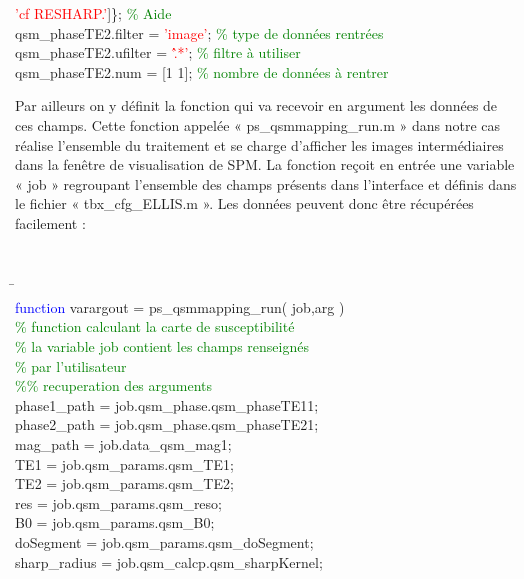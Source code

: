 {{\begin{tabbing}
\> \textcolor{red}{'cf RESHARP.'}]\}; \textcolor{green}{\% Aide}\\
\> qsm\_phaseTE2.filter = \textcolor{red}{'image'}; \textcolor{green}{\% type de données rentrées}\\
\> qsm\_phaseTE2.ufilter = \textcolor{red}{'\^.*'}; \textcolor{green}{\% filtre à utiliser}\\
\> qsm\_phaseTE2.num = [1 1]; \textcolor{green}{\% nombre de données à rentrer}\vspace{0.5cm}\\
\end{tabbing}
}
Par ailleurs on y définit la fonction qui va recevoir en argument les données de ces champs.
Cette fonction appelée « ps\_qsmmapping\_run.m » dans notre cas réalise l’ensemble du traitement et
se charge d’afficher les images intermédiaires dans la fenêtre de visualisation de SPM. La fonction
reçoit en entrée une variable « job » regroupant l’ensemble des champs présents dans l’interface et
définis dans le fichier « tbx\_cfg\_ELLIS.m ». Les données peuvent donc être récupérées facilement :\\ 
{\tt
\begin{tabbing}
\hspace{1cm}\=\hspace{1cm}\\
\> \textcolor{blue}{function} varargout = ps\_qsmmapping\_run( job,arg )\\
\> \textcolor{green}{\% function calculant la carte de susceptibilité}\\
\> \textcolor{green}{\% la variable job contient les champs renseignés}\\
\> \textcolor{green}{\% par l’utilisateur}\\
\> \textcolor{green}{\%\% recuperation des arguments}\\
\> phase1\_path = job.qsm\_phase.qsm\_phaseTE1{1};\\
\> phase2\_path = job.qsm\_phase.qsm\_phaseTE2{1};\\
\> mag\_path = job.data\_qsm\_mag{1};\\
\> TE1 = job.qsm\_params.qsm\_TE1;\\
\> TE2 = job.qsm\_params.qsm\_TE2;\\
\> res = job.qsm\_params.qsm\_reso;\\
\> B0 = job.qsm\_params.qsm\_B0;\\
\> doSegment = job.qsm\_params.qsm\_doSegment;\\
\> sharp\_radius = job.qsm\_calcp.qsm\_sharpKernel;\\

\end{tabbing}}}
